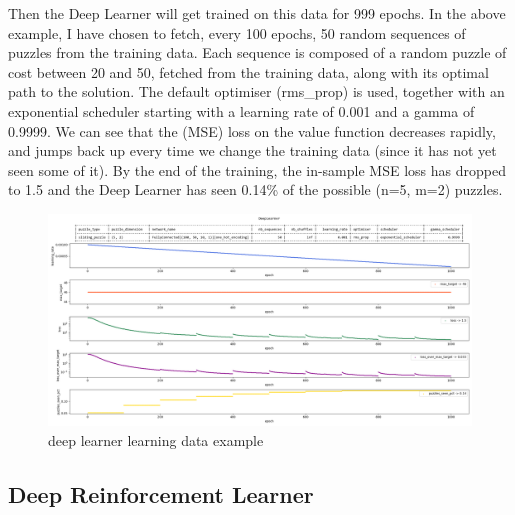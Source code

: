 Then the Deep Learner will get trained on this data for 999 epochs. In the above example, I have chosen to fetch, every 100 epochs, 50 random sequences of puzzles from the training data. Each sequence is composed of a random puzzle of cost between 20 and 50, fetched from the training data, along with its optimal path to the solution. The default optimiser (rms\_prop) is used, together with an exponential scheduler starting with a learning rate of 0.001 and a gamma of 0.9999. We can see that the (MSE) loss on the value function decreases rapidly, and jumps back up every time we change the training data (since it has not yet seen some of it). By the end of the training, the in-sample MSE loss has dropped to 1.5 and the Deep Learner has seen 0.14\% of the possible (n=5, m=2) puzzles.

\begin{landscape}
\centering\vspace*{\fill}
\begin{figure}[H]
\centering
\includegraphics[scale=0.45]{./Figures/exampledeeplearnerlearning}
\caption[Examples]{deep learner learning data example}
\label{fig:exampledeeplearnerlearning}
\end{figure}
\vfill
\end{landscape}
\restoregeometry






\subsection{Deep Reinforcement Learner}
\label{DRLSS}

